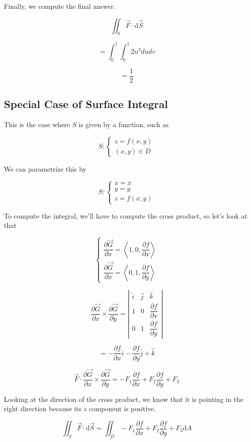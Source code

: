 \documentclass{article}
\newcommand{\D}[1]{\mathrm{d}#1}
\newcommand{\partialfrac}[2]{\dfrac{\partial #1}{\partial #2}}
\begin{document}
Finally, we compute the final answer.

\[
\iint_S \vec{F} \cdot \D{\vec{S}}
\]

\[
= \int_0^1 \int_0^1 2 u^3 du dv
\]

\[
= \frac{1}{2}
\]

\subsection*{Special Case of Surface Integral}

This is the case where $S$ is given by a function, such as

\[
S: \begin{cases}
  z = f(x,y) \\
  (x,y) \in D
  \end{cases}
\]

We can parametrize this by

\[
S: \begin{cases}
  x = x \\
  y = y \\
  z = f(x, y)
\end{cases}
\]

To compute the integral, we'll have to compute the cross product, so let's look at that

\[
\begin{cases}
  \partialfrac{\vec{G}}{x} = \left<1, 0, \partialfrac{f}{x}\right> \\
  \partialfrac{\vec{G}}{x} = \left<0, 1, \partialfrac{f}{y}\right>
\end{cases}
\]

\[
\partialfrac{\vec{G}}{x} \times \partialfrac{\vec{G}}{y}
= \left| \begin{array}{ccc}
  \hat{i} & \hat{j} & \hat{k} \\
  1 & 0 & \partialfrac{f}{x} \\
  0 & 1 & \partialfrac{f}{y}
  \end{array} \right|
\]

\[
= -\partialfrac{f}{x} \hat{i} - \partialfrac{f}{y} \hat{j} + \hat{k}
\]

\[
\vec{F} \cdot \partialfrac{\vec{G}}{x} \times \partialfrac{\vec{G}}{y}
=
- F_1 \partialfrac{f}{x} + F_2 \partialfrac{f}{y} + F_3
\]

Looking at the direction of the cross product, we know that it is pointing in the right direction because its $z$ component is positive.

\[
\iint_S \vec{F} \cdot \D{\vec{S}} = \iint_D - F_1 \partialfrac{f}{x} + F_2 \partialfrac{f}{y} + F_3 \D{A}
\]
\end{document}
